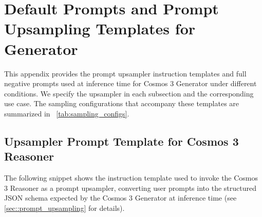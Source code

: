 \section{Default Prompts and Prompt Upsampling Templates for Generator}
This appendix provides the prompt upsampler instruction templates and  full negative prompts used at inference time for Cosmos 3 Generator under different conditions. We specify the upsampler in each subsection and the corresponding use case. The sampling configurations that accompany these templates are summarized in ~\cref{tab:sampling_configs}.

\subsection{Upsampler Prompt Template for Cosmos 3 Reasoner}
\label{appendix:upsampler_prompt_template}

The following snippet shows the instruction template used to invoke the Cosmos 3 Reasoner as a prompt upsampler, converting user prompts into the structured JSON schema expected by the Cosmos 3 Generator at inference time (see \cref{sec::prompt_upsampling} for details).

